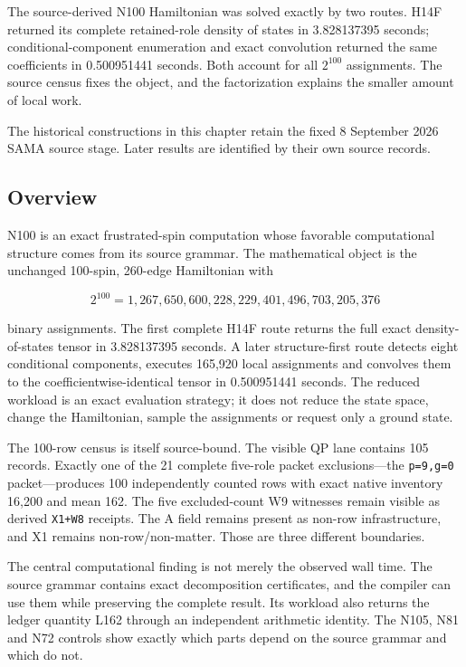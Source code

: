 \label{viii-ch01-n100-grammar-and-exact-work}

The source-derived N100 Hamiltonian was solved exactly by two routes. H14F returned its complete retained-role density of states in 3.828137395 seconds; conditional-component enumeration and exact convolution returned the same coefficients in 0.500951441 seconds. Both account for all $2^{100}$ assignments. The source census fixes the object, and the factorization explains the smaller amount of local work.

The historical constructions in this chapter retain the fixed 8 September 2026 SAMA source stage. Later results are identified by their own source records.

\subsection{Overview}\label{viii-ch01-overview}

N100 is an exact frustrated-spin computation whose favorable
computational structure comes from its source grammar. The mathematical
object is the unchanged 100-spin, 260-edge Hamiltonian with

\[
2^{100}=1{,}267{,}650{,}600{,}228{,}229{,}401{,}496{,}703{,}205{,}376
\]

binary assignments. The first complete H14F route returns the full exact
density-of-states tensor in 3.828137395 seconds. A later structure-first
route detects eight conditional components, executes 165,920 local
assignments and convolves them to the coefficientwise-identical tensor
in 0.500951441 seconds. The reduced workload is an exact evaluation
strategy; it does not reduce the state space, change the Hamiltonian,
sample the assignments or request only a ground state.

The 100-row census is itself source-bound. The visible QP lane contains
105 records. Exactly one of the 21 complete five-role packet
exclusions---the \texttt{p=9,g=0} packet---produces 100 independently
counted rows with exact native inventory 16,200 and mean 162. The five
excluded-count W9 witnesses remain visible as derived \texttt{X1+W8}
receipts. The A field remains present as non-row infrastructure, and X1
remains non-row/non-matter. Those are three different boundaries.

The central computational finding is not merely the observed wall time.
The source grammar contains exact decomposition certificates, and the
compiler can use them while preserving the complete result. Its workload
also returns the ledger quantity L162 through an independent arithmetic
identity. The N105, N81 and N72 controls show exactly which parts depend
on the source grammar and which do not.

